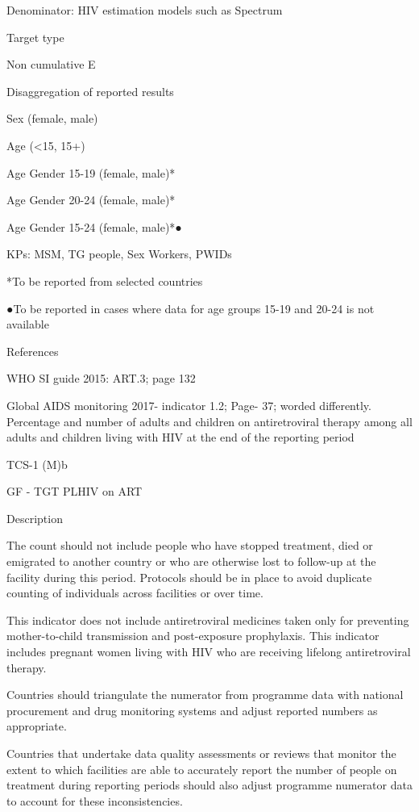 \documentclass[]{book}
\begin{document}
Denominator: HIV estimation models such as Spectrum

Target type

Non cumulative E

Disaggregation of reported results

Sex (female, male)

Age (\textless{}15, 15+)

Age \textbar{} Gender 15-19 (female, male)*

Age \textbar{} Gender 20-24 (female, male)*

Age \textbar{} Gender 15-24 (female, male)*●

KPs: MSM, TG people, Sex Workers, PWIDs

*To be reported from selected countries

●To be reported in cases where data for age groups 15-19 and 20-24 is not available

References

WHO SI guide 2015: ART.3; page 132

Global AIDS monitoring 2017- indicator 1.2; Page- 37; worded differently.
Percentage and number of adults and children on antiretroviral therapy among all adults and children living with HIV at the end of the reporting period

TCS-1 (M)b

GF - TGT PLHIV on ART

Description

The count should not include people who have stopped treatment, died or emigrated to another country or who are otherwise lost to follow-up at the facility during this period. Protocols should be in place to avoid duplicate counting of individuals across facilities or over time.

This indicator does not include antiretroviral medicines taken only for preventing mother-to-child transmission and post-exposure prophylaxis. This
indicator includes pregnant women living with HIV who are receiving lifelong antiretroviral therapy.

Countries should triangulate the numerator from programme data with national procurement and drug monitoring systems and adjust reported numbers as appropriate.

Countries that undertake data quality assessments or reviews that monitor the extent to which facilities are able to accurately report the number of people on treatment during reporting periods should also adjust programme numerator data to account for these inconsistencies.
\end{document}

